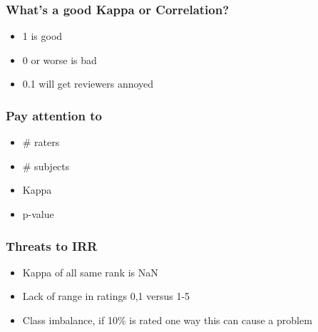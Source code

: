 \documentclass[bigger]{beamer}
\begin{document}
\begin{frame}
\frametitle{What's a good Kappa or Correlation?}
\label{sec-2-4}


\begin{itemize}
\item 1 is good
\item 0 or worse is bad
\item 0.1 will get reviewers annoyed
\end{itemize}
\end{frame}
\begin{frame}
\frametitle{Pay attention to}
\label{sec-2-5}


\begin{itemize}
\item \# raters
\item \# subjects
\item Kappa
\item p-value
\end{itemize}
\end{frame}
\begin{frame}
\frametitle{Threats to IRR}
\label{sec-2-6}


\begin{itemize}
\item Kappa of all same rank is NaN
\item Lack of range in ratings 0,1 versus 1-5
\item Class imbalance, if 10\% is rated one way this can cause a problem
\end{itemize}
\end{frame}
\end{document}
